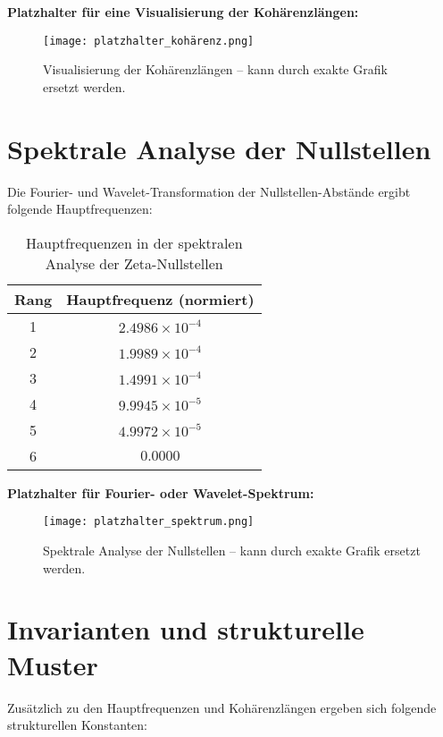 \documentclass[a4paper,12pt]{article}
\begin{document}
\vspace{0.5cm}
\noindent \textbf{Platzhalter für eine Visualisierung der Kohärenzlängen:}

\begin{figure}[h]
    \centering
    \texttt{[image: platzhalter\_kohärenz.png]}
    \caption{Visualisierung der Kohärenzlängen – kann durch exakte Grafik ersetzt werden.}
    \label{fig:kohärenz}
\end{figure}

\newpage

\section{Spektrale Analyse der Nullstellen}
Die Fourier- und Wavelet-Transformation der Nullstellen-Abstände ergibt folgende Hauptfrequenzen:

\begin{table}[h]
    \centering
    \renewcommand{\arraystretch}{1.4}
    \begin{tabular}{c c}
        \toprule
        \textbf{Rang} & \textbf{Hauptfrequenz (normiert)} \\
        \midrule
        1 & \( 2.4986 \times 10^{-4} \) \\
        2 & \( 1.9989 \times 10^{-4} \) \\
        3 & \( 1.4991 \times 10^{-4} \) \\
        4 & \( 9.9945 \times 10^{-5} \) \\
        5 & \( 4.9972 \times 10^{-5} \) \\
        6 & \( 0.0000 \) \\
        \bottomrule
    \end{tabular}
    \caption{Hauptfrequenzen in der spektralen Analyse der Zeta-Nullstellen}
\end{table}

\vspace{0.5cm}
\noindent \textbf{Platzhalter für Fourier- oder Wavelet-Spektrum:}

\begin{figure}[h]
    \centering
    \texttt{[image: platzhalter\_spektrum.png]}
    \caption{Spektrale Analyse der Nullstellen – kann durch exakte Grafik ersetzt werden.}
    \label{fig:spektrum}
\end{figure}

\newpage

\section{Invarianten und strukturelle Muster}
\noindent Zusätzlich zu den Hauptfrequenzen und Kohärenzlängen ergeben sich folgende strukturellen Konstanten:
\end{document}
